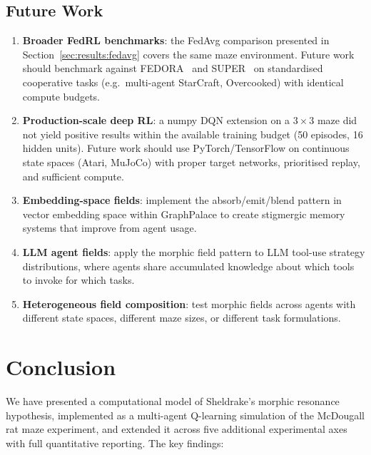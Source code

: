 \documentclass[twoside,11pt]{article}
\begin{document}
\subsection{Future Work}
\label{sec:discussion:future}

\begin{enumerate}[leftmargin=2em]
    \item \textbf{Broader FedRL benchmarks}: the FedAvg comparison presented
          in Section~\ref{sec:results:fedavg} covers the same maze environment.
          Future work should benchmark against FEDORA~\citep{che2023} and
          SUPER~\citep{gerstgrasser2023} on standardised cooperative tasks
          (e.g.\ multi-agent StarCraft, Overcooked) with identical compute budgets.
    \item \textbf{Production-scale deep RL}: a numpy DQN extension on a
          $3\times3$ maze did not yield positive results within the available
          training budget (50 episodes, 16 hidden units).  Future work should
          use PyTorch/TensorFlow on continuous state spaces (Atari, MuJoCo)
          with proper target networks, prioritised replay, and sufficient
          compute.
    \item \textbf{Embedding-space fields}: implement the absorb/emit/blend
          pattern in vector embedding space within GraphPalace to create
          stigmergic memory systems that improve from agent usage.
    \item \textbf{LLM agent fields}: apply the morphic field pattern to
          LLM tool-use strategy distributions, where agents share accumulated
          knowledge about which tools to invoke for which tasks.
    \item \textbf{Heterogeneous field composition}: test morphic fields across
          agents with different state spaces, different maze sizes, or
          different task formulations.
\end{enumerate}


\section{Conclusion}
\label{sec:conclusion}

We have presented a computational model of Sheldrake's morphic resonance
hypothesis, implemented as a multi-agent Q-learning simulation of the
McDougall rat maze experiment, and extended it across five additional
experimental axes with full quantitative reporting.  The key findings:
\end{document}

